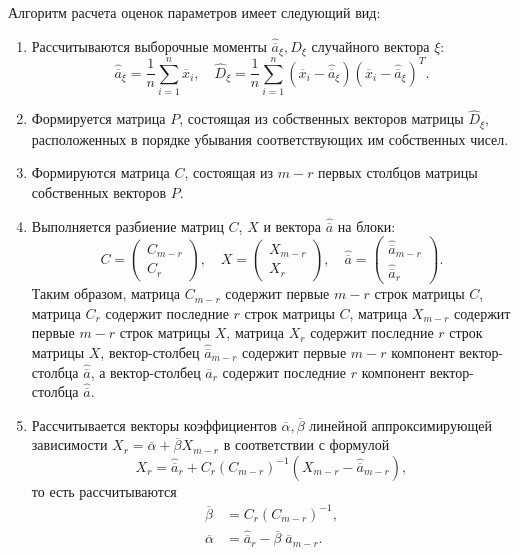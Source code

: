 Алгоритм расчета оценок параметров имеет следующий вид:
\begin{enumerate}
\item Рассчитываются выборочные моменты \( \hat{\overline{a}}_{\xi}, D_{\xi} \) случайного вектора \( \xi \):
  \begin{equation*}
    \hat{\overline{a}}_{\xi} = \dfrac{1}{n} \sum_{i=1}^n \overline{x}_i, \quad
    \hat{D}_{\xi} =
    \dfrac{1}{n}  \sum_{i=1}^n
    (\overline{x}_i - \hat{\overline{a}}_{\xi})
    (\overline{x}_i - \hat{\overline{a}}_{\xi})^T.
  \end{equation*}
\item Формируется матрица \( P \), состоящая из собственных векторов матрицы \( \hat{D}_{\xi} \),
  расположенных в порядке убывания соответствующих им собственных чисел.
\item Формируются матрица \( C \), состоящая из \( m-r \) первых столбцов
  матрицы собственных векторов \( P \).
\item Выполняется разбиение матриц \( C \), \( X \) и вектора \( \hat{\overline{a}} \) на блоки:
  \begin{equation*}
    C =
    \begin{pmatrix}
      C_{m-r} \\
      C_{r}
    \end{pmatrix}, \quad
    X =
    \begin{pmatrix}
      X_{m-r} \\
      X_{r}
    \end{pmatrix}, \quad
    \hat{\overline{a}} =
    \begin{pmatrix}
      \hat{\overline{a}}_{m-r} \\
      \hat{\overline{a}}_{r}
    \end{pmatrix}.
  \end{equation*}
  Таким образом, матрица \( C_{m-r} \)  содержит первые \( m-r \) строк матрицы \( C \),
  матрица \( C_{r} \)  содержит последние \( r \) строк матрицы \( C \),
  матрица \( X_{m-r} \) содержит первые \( m-r \) строк матрицы \( X \),
  матрица \( X_{r} \) содержит последние \( r \) строк матрицы \( X \),
  вектор-столбец \( \hat{\overline{a}}_{m-r} \) содержит первые \( m - r \) компонент
  вектор-столбца \( \hat{\overline{a}} \),
  а вектор-столбец \( \hat{\overline{a}}_{r} \) содержит последние \( r \) компонент
  вектор-столбца \( \hat{\overline{a}} \).
\item Рассчитывается векторы коэффициентов \( \overline{\alpha}, \overline{\beta} \)
  линейной аппроксимирующей зависимости
  \( X_r = \overline{\alpha} + \overline{\beta} X_{m-r}\)
  в соответствии с формулой
  \[ X_r = \hat{\overline{a}}_r + C_r (C_{m-r})^{-1} (X_{m-r} - \hat{\overline{a}}_{m-r}), \]
  то есть рассчитываются
  \begin{equation*}
    \begin{aligned}
      \overline{\beta} &= C_{r} (C_{m-r})^{-1}, \\
      \overline{\alpha} &= \hat{\overline{a}}_{r} - \overline{\beta} \; \hat{\overline{a}}_{m-r}.
    \end{aligned}
  \end{equation*}
\end{enumerate}

